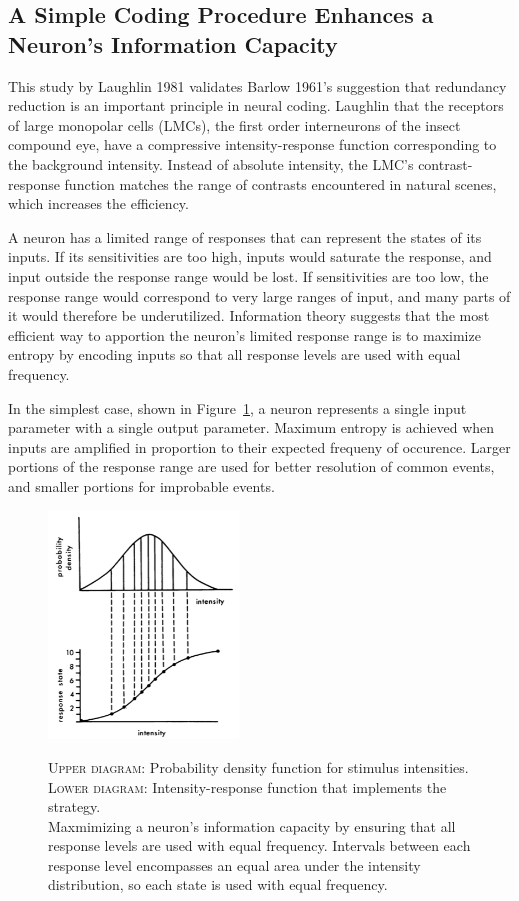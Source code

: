 \documentclass[twoside]{article}
\begin{document}
\begin{multicols}{2}
\section{A Simple Coding Procedure Enhances a Neuron's Information Capacity}

This study by Laughlin 1981 validates Barlow 1961's suggestion that redundancy reduction is an important principle in neural coding. Laughlin that the receptors of large monopolar cells (LMCs), the first order interneurons of the insect compound eye, have a compressive intensity-response function corresponding to the background intensity. Instead of absolute intensity, the LMC's contrast-response function matches the range of contrasts encountered in natural scenes, which increases the efficiency.

A neuron has a limited range of responses that can represent the states of its inputs. If its sensitivities are too high, inputs would saturate the response, and input outside the response range would be lost. If sensitivities are too low, the response range would correspond to very large ranges of input, and many parts of it would therefore be underutilized. Information theory suggests that the most efficient way to apportion the neuron's limited response range is to maximize entropy by encoding inputs so that all response levels are used with equal frequency. 

In the simplest case, shown in Figure~\ref{fig:laughlin1981-fig1}, a neuron represents a single input parameter with a single output parameter. Maximum entropy is achieved when inputs are amplified in proportion to their expected frequeny of occurence. Larger portions of the response range are used for better resolution of common events, and smaller portions for improbable events. 

\begin{figure}[H]
	\caption{
		\textsc{Upper diagram:} Probability density function for stimulus intensities. \\ \textsc{Lower diagram:} Intensity-response function that implements the strategy. \\ Maxmimizing a neuron's information capacity by ensuring that all response levels are used with equal frequency. Intervals between each response level encompasses an equal area under the intensity distribution, so each state is used with equal frequency.
	}
	\includegraphics[width=0.45\textwidth]{laughlin1981-fig1}
	\label{fig:laughlin1981-fig1}
\end{figure}


\end{multicols}
\end{document}

